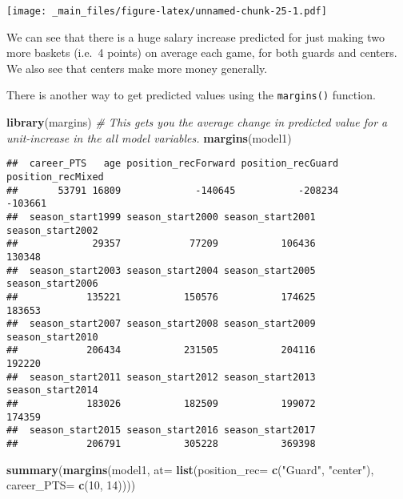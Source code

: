 \documentclass[
]{book}
\newenvironment{Shaded}{\begin{snugshade}}{\end{snugshade}}
\newcommand{\AttributeTok}[1]{\textcolor[rgb]{0.13,0.29,0.53}{#1}}
\newcommand{\CommentTok}[1]{\textcolor[rgb]{0.56,0.35,0.01}{\textit{#1}}}
\newcommand{\DecValTok}[1]{\textcolor[rgb]{0.00,0.00,0.81}{#1}}
\newcommand{\FunctionTok}[1]{\textcolor[rgb]{0.13,0.29,0.53}{\textbf{#1}}}
\newcommand{\NormalTok}[1]{#1}
\newcommand{\StringTok}[1]{\textcolor[rgb]{0.31,0.60,0.02}{#1}}
\begin{document}
\texttt{[image: \_main\_files/figure-latex/unnamed-chunk-25-1.pdf]}

We can see that there is a huge salary increase predicted for just making two more baskets (i.e.~4 points) on average each game, for both guards and centers. We also see that centers make more money generally.

There is another way to get predicted values using the \texttt{margins()} function.

\begin{Shaded}
\begin{Highlighting}[]
\FunctionTok{library}\NormalTok{(margins)}
\CommentTok{\# This gets you the average change in predicted value for a unit{-}increase in the all model variables.}
\FunctionTok{margins}\NormalTok{(model1)}
\end{Highlighting}
\end{Shaded}

\begin{verbatim}
##  career_PTS   age position_recForward position_recGuard position_recMixed
##       53791 16809             -140645           -208234           -103661
##  season_start1999 season_start2000 season_start2001 season_start2002
##             29357            77209           106436           130348
##  season_start2003 season_start2004 season_start2005 season_start2006
##            135221           150576           174625           183653
##  season_start2007 season_start2008 season_start2009 season_start2010
##            206434           231505           204116           192220
##  season_start2011 season_start2012 season_start2013 season_start2014
##            183026           182509           199072           174359
##  season_start2015 season_start2016 season_start2017
##            206791           305228           369398
\end{verbatim}

\begin{Shaded}
\begin{Highlighting}[]
\FunctionTok{summary}\NormalTok{(}\FunctionTok{margins}\NormalTok{(model1, }\AttributeTok{at=} \FunctionTok{list}\NormalTok{(}\AttributeTok{position\_rec=} \FunctionTok{c}\NormalTok{(}\StringTok{"Guard"}\NormalTok{, }\StringTok{"center"}\NormalTok{),}
                         \AttributeTok{career\_PTS=} \FunctionTok{c}\NormalTok{(}\DecValTok{10}\NormalTok{, }\DecValTok{14}\NormalTok{))))}
\end{Highlighting}
\end{Shaded}
\end{document}
